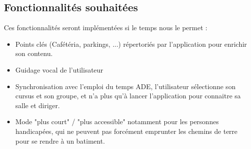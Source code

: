 \documentclass{article}
\begin{document}
	\subsection{Fonctionnalités souhaitées}
	Ces fonctionnalités seront implémentées si le temps nous le permet :
	\begin{itemize}
		\item Points clés (Cafétéria, parkings, ...) répertoriés par l'application pour enrichir son contenu.
		\item Guidage vocal de l'utilisateur
		\item Synchronisation avec l'emploi du temps ADE, l'utilisateur sélectionne son cursus et son groupe, et n'a plus qu'à lancer l'application pour connaitre sa salle et diriger.
		\item Mode "plus court" / "plus accessible" notamment pour les personnes handicapées, qui ne peuvent pas forcément emprunter les chemins de terre pour se rendre à un batiment.
	\end{itemize}
	
\end{document}
